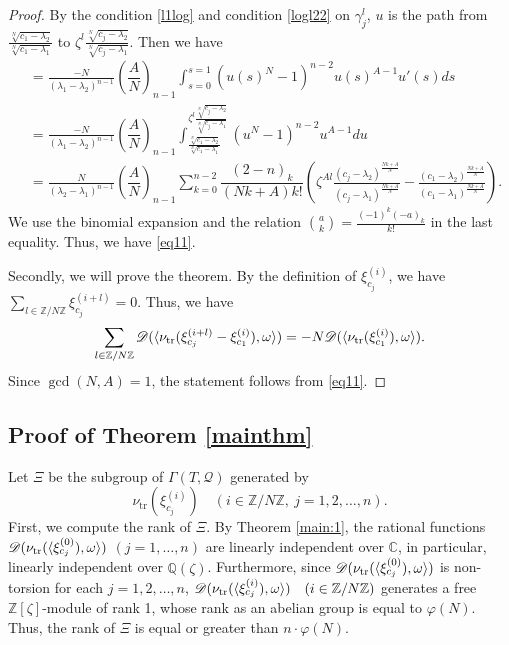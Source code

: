 \documentclass[letterpaper, 11pt]{amsart}
\theoremstyle{my theoremstyle}
\theoremstyle{dfn}
\theoremstyle{remark}
\renewcommand{\1}{\mathbbm{1}}
\newcommand{\C}{\mathbb{C}}
\newcommand{\Q}{\mathbb{Q}}
\newcommand{\Z}{\mathbb{Z}}
\renewcommand{\l}{\lambda}
\numberwithin{equation}{section}
\begin{document}
\begin{proof}
By the condition \ref{l1log} and condition \ref{logl22} on $\gamma_j^l$, $u$ is the path from $\frac{\sqrt[N]{c_1-\l_2}}{\sqrt[N]{c_1-\l_1}}$ to $\zeta^l\frac{\sqrt[N]{c_j-\l_2}}{\sqrt[N]{c_j-\l_1}}$.
Then we have
\begin{align*}
&=\frac{-N}{(\l_1-\l_2)^{n-1}} \left(\dfrac{A}N\right)_{n-1} \int_{s=0}^{s=1} (u(s)^N-1)^{n-2}u(s)^{A-1}u'(s)ds \\
&=\frac{-N}{(\l_1-\l_2)^{n-1}} \left(\dfrac{A}N\right)_{n-1}\int_{\frac{\sqrt[N]{c_1-\l_2}}{\sqrt[N]{c_1-\l_1}}}^{\zeta^l\frac{\sqrt[N]{c_j-\l_2}}{\sqrt[N]{c_j-\l_1}}} (u^N-1)^{n-2}u^{A-1}du \\
&= \frac{N}{(\l_2-\l_1)^{n-1}} \left(\dfrac{A}N\right)_{n-1}
 \sum_{k=0}^{n-2}  \dfrac{(2-n)_k}{(Nk+A)k!} 
  \left(\zeta^{Al} \frac{(c_j-\l_2)^{\frac{Nk+A}{N}}}{(c_j-\l_1)^{\frac{Nk+A}{N}}}- \frac{(c_1-\l_2)^{\frac{Nk+A}{N}}}{(c_1-\l_1)^{\frac{Nk+A}{N}}}\right). 
\end{align*}
We use the binomial expansion and the relation $\binom{a}{k}=\frac{(-1)^k(-a)_k}{k!}$ in the last equality.
Thus, we have \eqref{eq11}. 

Secondly, we will prove the theorem. 
By the definition of $\xi_{c_j}^{(i)}$, we have $\sum_{l\in \Z/N\Z}\xi_{c_j}^{(i+l)}=0$.
Thus, we have
\begin{equation*}
\sum_{l\in\Z/N\Z}\mathscr{D}(\langle \nu_{\rm tr}(\xi_{c_j}^{(i+l)} - \xi_{c_1}^{(i)}), \omega \rangle)=-N\mathscr{D}(\langle
\nu_{\rm tr}(\xi_{c_1}^{(i)}), \omega\rangle).
\end{equation*}
Since $\gcd(N, A)=1$, the statement follows from \eqref{eq11}.   
\end{proof}



\subsection{Proof of Theorem \ref{mainthm}}

Let $\Xi$ be the subgroup of $\Gamma(T,\mathcal{Q})$ generated by
\begin{equation*}
\nu_{\mathrm{tr}}(\xi_{c_j}^{(i)})\quad (i\in \Z/N\Z,\ j=1,2,\dots,n).
\end{equation*}
First, we compute the rank of $\Xi$.
By Theorem \ref{main:1}, the rational functions $\mathscr{D}(\nu_{\rm tr}(\langle \xi_{c_j}^{(0)}), \omega \rangle)$ $(j=1, \ldots, n)$ are linearly independent over $\C$, in particular, linearly independent over $\Q(\zeta)$.
Furthermore, since $\mathscr{D}(\nu_{\rm tr}(\langle \xi_{c_j}^{(0)}), \omega \rangle)$ is non-torsion for each $j=1,2,\dots, n$, $\mathscr{D}(\nu_{\rm tr}(\langle \xi_{c_j}^{(i)}), \omega \rangle)\quad (i\in \Z/N\Z)$ generates a free $\Z[\zeta]$-module of rank 1, whose rank as an abelian group is equal to $\varphi(N)$. 
Thus, the rank of $\Xi$ is equal or greater than $n\cdot \varphi(N)$.
\end{document}
